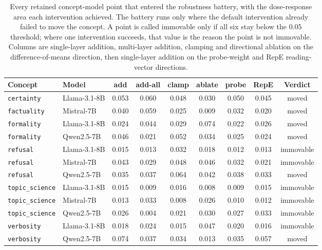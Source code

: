 \documentclass{article}
\begin{document}
\begin{table}[htbp]
  \caption{Every retained concept-model point that entered the robustness battery, with
  the dose-response area each intervention achieved. The battery runs only where
  the default intervention already failed to move the concept. A point is called
  immovable only if all six stay below the $0.05$ threshold; where one
  intervention succeeds, that value is the reason the point is not immovable.
  Columns are single-layer addition, multi-layer addition, clamping and
  directional ablation on the difference-of-means direction, then single-layer
  addition on the probe-weight and RepE reading-vector directions.}
  \label{tab:gauntlet}
  \centering
  \footnotesize
  \begin{tabular}{llccccccc}
    \toprule
    Concept & Model & add & add-all & clamp & ablate & probe & RepE & Verdict \\
    \midrule
    \texttt{certainty} & Llama-3.1-8B & 0.053 & 0.060 & 0.048 & 0.030 & 0.050 & 0.045 & moved \\
    \texttt{factuality} & Mistral-7B & 0.040 & 0.059 & 0.025 & 0.009 & 0.032 & 0.020 & moved \\
    \texttt{formality} & Llama-3.1-8B & 0.024 & 0.044 & 0.029 & 0.074 & 0.022 & 0.026 & moved \\
    \texttt{formality} & Qwen2.5-7B & 0.046 & 0.021 & 0.052 & 0.034 & 0.025 & 0.024 & moved \\
    \texttt{refusal} & Llama-3.1-8B & 0.015 & 0.013 & 0.032 & 0.018 & 0.012 & 0.013 & immovable \\
    \texttt{refusal} & Mistral-7B & 0.043 & 0.029 & 0.048 & 0.046 & 0.032 & 0.021 & immovable \\
    \texttt{refusal} & Qwen2.5-7B & 0.035 & 0.037 & 0.064 & 0.042 & 0.038 & 0.033 & moved \\
    \texttt{topic\_science} & Llama-3.1-8B & 0.015 & 0.009 & 0.016 & 0.008 & 0.009 & 0.015 & immovable \\
    \texttt{topic\_science} & Mistral-7B & 0.013 & 0.033 & 0.008 & 0.026 & 0.010 & 0.012 & immovable \\
    \texttt{topic\_science} & Qwen2.5-7B & 0.026 & 0.004 & 0.021 & 0.030 & 0.027 & 0.033 & immovable \\
    \texttt{verbosity} & Llama-3.1-8B & 0.018 & 0.024 & 0.015 & 0.047 & 0.020 & 0.016 & immovable \\
    \texttt{verbosity} & Qwen2.5-7B & 0.074 & 0.037 & 0.034 & 0.013 & 0.035 & 0.057 & moved \\
    \bottomrule
  \end{tabular}
\end{table}
\end{document}
